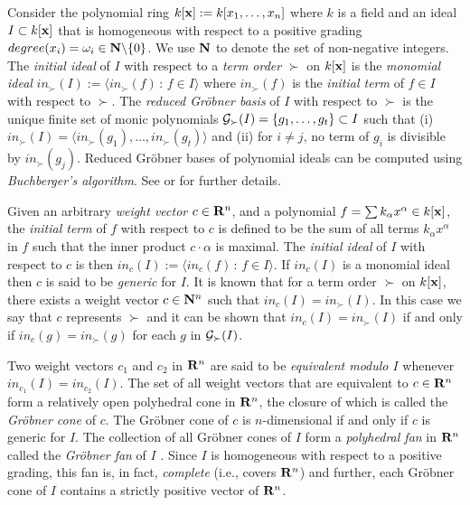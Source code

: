 \documentclass[11pt]{article}
\begin{document}
Consider the polynomial ring $k[{\bf x}] := k[x_1, \ldots, x_n]$ where
$k$ is a field and an ideal $I \subset k[{\bf x}]$ that is 
homogeneous with respect to a positive grading $degree(x_i) =
\omega_i \in {\bf N} \backslash \{0\}$. 
We use ${\bf N}$ to denote the set of non-negative integers. The
{\em initial ideal} of $I$ with respect to a {\em term order} $\succ$
on $k[{\bf x}]$ is the {\em monomial ideal} $in_{\succ}(I) := \langle
in_{\succ}(f) \, : \, f \in I \rangle$ where $in_{\succ}(f)$ is the
{\em initial term} of $f \in I$ with respect to $\succ$. The {\em
reduced Gr\"obner basis} of $I$ with respect to $\succ$ is the unique
finite set of monic polynomials   ${\cal G}_{\succ}(I) = \{g_1,
\ldots, g_t \} \subset I$ such that (i) $in_{\succ}(I) = \langle
in_{\succ}(g_1), \ldots, in_{\succ}(g_t) \rangle$ and (ii) for $i \neq j$,
no term of $g_i$ is divisible by $in_{\succ}(g_j)$. Reduced Gr\"obner
bases of polynomial ideals can be computed using {\em Buchberger's
algorithm}. See \cite{AL} or \cite{CLO} for further details.

Given an arbitrary {\em weight vector} $c \in {\bf R}^n$, and a
polynomial $f = \sum k_{\alpha}x^{\alpha} \in k[{\bf x}]$, the 
{\em initial term} of $f$ with respect to $c$ is defined to be the sum of all 
terms $k_{\alpha}x^{\alpha}$ in $f$ such that the inner product 
$c \cdot \alpha$ is maximal. The {\em initial ideal} of $I$ with
respect to $c$ is then $in_c(I) := \langle in_c(f) \, : \, f \in I
\rangle$. If $in_c(I)$ is a monomial ideal then $c$ is said to be 
{\em generic} for $I$. It is known that for a term order $\succ$ on 
$k[{\bf x}]$, there exists a weight vector $c \in {\bf N}^n$ such that 
$in_c(I) = in_{\succ}(I)$. In this case we say that $c$ represents $\succ$ 
and it can be shown that $in_c(I) = in_{\succ}(I)$ if and only if 
$in_c(g) = in_{\succ}(g)$ for each $g$ in ${\cal G}_{\succ}(I)$.

Two weight vectors $c_1$ and $c_2$ in ${\bf R}^n$ are said to be
{\em equivalent modulo $I$} whenever $in_{c_1}(I) = in_{c_2}(I)$. The
set of all weight vectors that are equivalent to $c \in {\bf R}^n$ form
a relatively open polyhedral cone in ${\bf R}^n$, the closure of which
is called the {\em Gr\"obner cone} of $c$. The Gr\"obner cone of $c$
is $n$-dimensional if and only if $c$ 
is generic for $I$. The collection of all Gr\"obner cones 
of $I$ form a {\em polyhedral fan} in ${\bf
R}^n$ called the {\em Gr\"obner fan} of $I$ \cite{MR}. Since $I$ is  
homogeneous with respect to a positive grading, 
this fan is, in fact, {\em complete} (i.e., covers ${\bf R}^n$) and
further, each Gr\"obner cone of $I$ contains a strictly positive vector 
of ${\bf R}^n$. 
\end{document}
